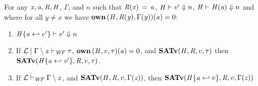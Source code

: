 \documentclass[runningheads]{llncs}
\begin{document}
\begin{lemma}
  For any $\mathit{x}, \mathit{a}, \mathit{R}, \mathit{H}$, $\Gamma$, and $n$ such that
  $\mathit{R}  (  \mathit{x}  ) \, = \, \mathit{a}$, $ \mathit{H} \vdash   v'  \Downarrow  n $, $ \mathit{H} \vdash   \mathit{H}  (  \mathit{a}  )  \Downarrow  n $ and where for all
  $y \neq x$ we have $\mathbf{own} \, (  \mathit{H}  ,  \mathit{R}  (  \mathit{y}  )  ,  \Gamma  (  \mathit{y}  )  )  (  \mathit{a}  )  =  0$:
  \begin{enumerate}
  \item $ \mathit{H}  \{  \mathit{a}  \hookleftarrow  v'  \} \vdash   v'  \Downarrow  n $
  \item If $ \mathcal{L}   \mid    \Gamma  \setminus  \mathit{x}    \vdash _{\mathit{WF}}  \tau $, $\mathbf{own} \, (  \mathit{H}  ,  v  ,  \tau  )  (  \mathit{a}  )  =  0$, and $ \mathbf{SATv} ( \mathit{H} , \mathit{R} , v , \tau ) $
    then $ \mathbf{SATv} ( \mathit{H}  \{  \mathit{a}  \hookleftarrow  \mathit{v'}  \} , \mathit{R} , v , \tau ) $.
  \item If $ \mathcal{L}   \vdash _{\mathit{WF}}   \Gamma  \setminus  \mathit{x}  $, and $ \mathbf{SATv} ( \mathit{H} , \mathit{R} , v , \Gamma  (  \mathit{z}  ) ) $, then $ \mathbf{SATv} ( \mathit{H}  \{  \mathit{a}  \hookleftarrow  v  \} , \mathit{R} , v , \Gamma  (  \mathit{z}  ) ) $
  \end{enumerate}
\end{lemma}
\end{document}
